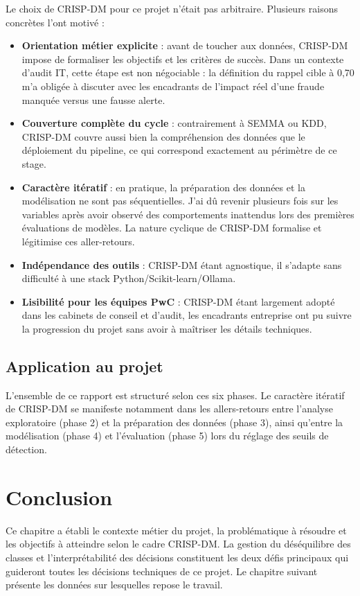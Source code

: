 \documentclass[12pt,a4paper,twoside]{report}
\begin{document}
\newpage
Le choix de CRISP-DM pour ce projet n'était pas arbitraire. Plusieurs raisons concrètes l'ont motivé :
\begin{itemize}
  \item \textbf{Orientation métier explicite} : avant de toucher aux données, CRISP-DM impose de formaliser les objectifs et les critères de succès. Dans un contexte d'audit IT, cette étape est non négociable : la définition du rappel cible à 0,70 m'a obligée à discuter avec les encadrants de l'impact réel d'une fraude manquée versus une fausse alerte.
  \item \textbf{Couverture complète du cycle} : contrairement à SEMMA ou KDD, CRISP-DM couvre aussi bien la compréhension des données que le déploiement du pipeline, ce qui correspond exactement au périmètre de ce stage.
  \item \textbf{Caractère itératif} : en pratique, la préparation des données et la modélisation ne sont pas séquentielles. J'ai dû revenir plusieurs fois sur les variables après avoir observé des comportements inattendus lors des premières évaluations de modèles. La nature cyclique de CRISP-DM formalise et légitimise ces aller-retours.
  \item \textbf{Indépendance des outils} : CRISP-DM étant agnostique, il s'adapte sans difficulté à une stack Python/Scikit-learn/Ollama.
  \item \textbf{Lisibilité pour les équipes PwC} : CRISP-DM étant largement adopté dans les cabinets de conseil et d'audit, les encadrants entreprise ont pu suivre la progression du projet sans avoir à maîtriser les détails techniques.
\end{itemize}

\subsection{Application au projet}

L'ensemble de ce rapport est structuré selon ces six phases. Le caractère itératif de CRISP-DM se manifeste notamment dans les allers-retours entre l'analyse exploratoire (phase 2) et la préparation des données (phase 3), ainsi qu'entre la modélisation (phase 4) et l'évaluation (phase 5) lors du réglage des seuils de détection.

\section{Conclusion}

Ce chapitre a établi le contexte métier du projet, la problématique à résoudre et les objectifs à atteindre selon le cadre CRISP-DM. La gestion du déséquilibre des classes et l'interprétabilité des décisions constituent les deux défis principaux qui guideront toutes les décisions techniques de ce projet. Le chapitre suivant présente les données sur lesquelles repose le travail.
\end{document}

